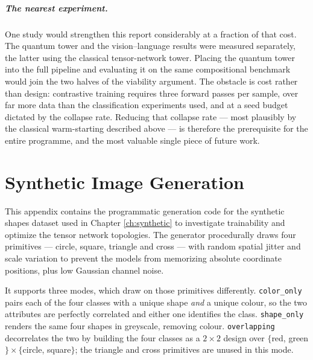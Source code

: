 \documentclass[12pt, a4paper, oneside]{report}
\begin{document}
\paragraph{The nearest experiment.} One study would strengthen this report
considerably at a fraction of that cost. The quantum tower and the
vision--language results were measured separately, the latter using the
classical tensor-network tower. Placing the quantum tower into the full pipeline
and evaluating it on the same compositional benchmark would join the two halves
of the viability argument. The obstacle is cost rather than design: contrastive
training requires three forward passes per sample, over far more data than the
classification experiments used, and at a seed budget dictated by the collapse
rate. Reducing that collapse rate --- most plausibly by the classical
warm-starting described above --- is therefore the prerequisite for the entire
programme, and the most valuable single piece of future work.







\appendix
\chapter{Synthetic Image Generation}

\label{appendix:synthetic_data}
This appendix contains the programmatic generation code for the synthetic shapes dataset used in Chapter \ref{ch:synthetic} to investigate trainability and optimize the tensor network topologies. The generator procedurally draws four primitives --- circle, square, triangle and cross --- with random spatial jitter and scale variation to prevent the models from memorizing absolute coordinate positions, plus low Gaussian channel noise.

It supports three modes, which draw on those primitives differently. \texttt{color\_only} pairs each of the four classes with a unique shape \textit{and} a unique colour, so the two attributes are perfectly correlated and either one identifies the class. \texttt{shape\_only} renders the same four shapes in greyscale, removing colour. \texttt{overlapping} decorrelates the two by building the four classes as a $2 \times 2$ design over $\{$red, green$\}\times\{$circle, square$\}$; the triangle and cross primitives are unused in this mode.
\end{document}
